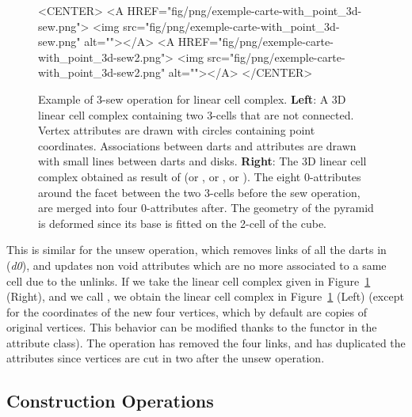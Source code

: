 \begin{figure}
\begin{ccTexOnly}
\begin{center}
    \end{center}
  \end{ccTexOnly}
  \begin{ccHtmlOnly}
    <CENTER>
    <A HREF="fig/png/exemple-carte-with_point_3d-sew.png">
        <img src="fig/png/exemple-carte-with_point_3d-sew.png" alt=""></A>
    <A HREF="fig/png/exemple-carte-with_point_3d-sew2.png">
        <img src="fig/png/exemple-carte-with_point_3d-sew2.png" alt=""></A>
    </CENTER>
    \end{ccHtmlOnly}
    \caption{Example of 3-sew operation for linear cell complex.
      \textbf{Left}: A 3D linear cell complex containing two 3-cells
      that are not connected. Vertex attributes are drawn with circles
      containing point coordinates.  Associations between darts and
      attributes are drawn with small lines between darts and
      disks. \textbf{Right}: The 3D linear cell complex obtained as
      result of  (or , or
      , or ).  The eight
      0-attributes around the facet between the two 3-cells before the
      sew operation, are merged into four 0-attributes after. The
      geometry of the pyramid is deformed since its base is fitted on
      the 2-cell of the cube.}
    \label{fig-lcc-exemple-sew}
\end{figure} 

This is similar for the unsew operation, which removes \betai{} links
of all the darts in
\orbit{\betaun{},\myldots{},\betaimdeux{},\betaipdeux{},\myldots{},\betad{}}(\emph{d0}), 
and updates
non void attributes which are no more associated to a same cell due to
the unlinks.  If we take the linear cell complex given in
Figure~\ref{fig-lcc-exemple-sew} (Right), and we call
, we obtain the linear cell complex in
Figure~\ref{fig-lcc-exemple-sew} (Left) (except for the coordinates of
the new four vertices, which by default are copies of original
vertices. This behavior can be modified thanks to the functor
 in the attribute class).  The  operation
has removed the four \betatrois{} links, and has duplicated the attributes
since vertices are cut in two after the unsew operation.

\subsection{Construction Operations}\label{ssec-constructions-op}

